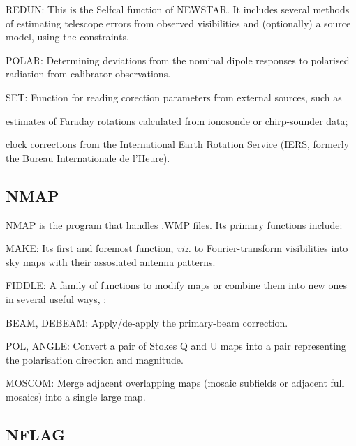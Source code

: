 \bi
\label{.redun}
\item   REDUN: This is the Selfcal function of NEWSTAR. It includes several
methods of estimating telescope errors from observed visibilities and
(optionally) a source model, using the  constraints.

\item   POLAR: Determining deviations from the nominal dipole responses to
polarised radiation from calibrator observations.

\item   SET: Function for reading corection parameters from external sources,
such as

  \bi
  \item estimates of Faraday rotations calculated from ionosonde or
chirp-sounder data;

  \item clock corrections from the International Earth Rotation Service (IERS,
formerly the Bureau Internationale de l'Heure).
  \ei
\ei


\subsection{ NMAP}
\label{.nmap}

	NMAP is the program that handles .WMP files. Its primary functions
include:

\bi
\item   MAKE: Its first and foremost function, {\em viz.} to Fourier-transform
visibilities into sky maps with their assosiated antenna patterns.

\item   FIDDLE: A family of functions to modify maps or combine them into new
ones in several useful ways, \eg:

  \bi
  \item BEAM, DEBEAM: Apply/de-apply the primary-beam correction.

  \item POL, ANGLE: Convert a pair of Stokes Q and U maps into a pair
representing the polarisation direction and magnitude.

  \item MOSCOM: Merge adjacent overlapping maps (\eg mosaic subfields or
adjacent full mosaics) into a single large map.

\ei\ei


\subsection{ NFLAG}
\label{.nflag}


